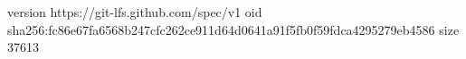 version https://git-lfs.github.com/spec/v1
oid sha256:fc86e67fa6568b247cfc262ce911d64d0641a91f5fb0f59fdca4295279eb4586
size 37613

